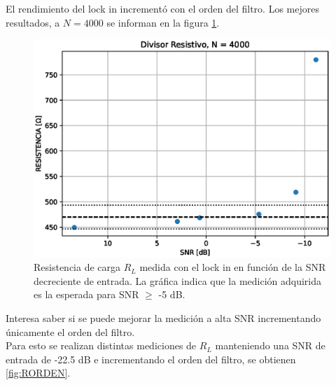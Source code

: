 \documentclass[11pt,a4paper]{extarticle}
\begin{document}
\begin{multicols}{2}
El rendimiento del lock in incrementó con el orden del filtro. Los mejores resultados, a $N = 4000$ se informan en la figura \ref{fig:RvsSNR}.

\begin{figure}[H]
	\centering
	\includegraphics[width=\linewidth]{Images/resistencia4000.eps}
	\caption{Resistencia de carga $R_L$ medida con 
	el lock in en función de la SNR decreciente de entrada. La gráfica indica que la medición adquirida es la esperada para SNR $\ge$ -5 dB.}
	\label{fig:RvsSNR}
\end{figure}

Interesa saber si se puede mejorar la medición a alta SNR incrementando únicamente el orden del filtro.\\


Para esto se realizan distintas mediciones de $R_L$
manteniendo una SNR de entrada de -22.5 dB e incrementando el orden del filtro, se obtienen
\ref{fig:RORDEN}.\\



\end{multicols}
\end{document}
